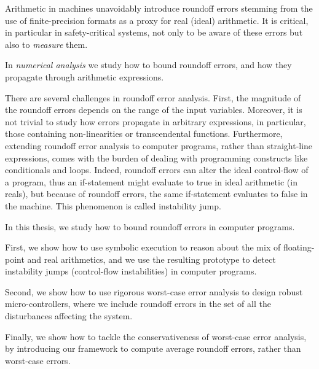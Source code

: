 %
Arithmetic in machines unavoidably introduce roundoff errors stemming from the use of finite-precision formats as a proxy for real (ideal) arithmetic. 
%
It is critical, in particular in safety-critical systems, not only to be aware of these errors but also to \emph{measure} them.
%

In \emph{numerical analysis} we study how to bound roundoff errors, and how they propagate through arithmetic expressions.
%

There are several challenges in roundoff error analysis. 
%
First, the magnitude of the roundoff errors depends on the range of the input variables. 
%
Moreover, it is not trivial to study how errors propagate in arbitrary expressions, in particular, those containing non-linearities or transcendental functions.
%
Furthermore, extending roundoff error analysis to computer programs, rather than straight-line expressions, comes with the burden of dealing with programming constructs like conditionals and loops. 
%
Indeed, roundoff errors can alter the ideal control-flow of a program, thus an if-statement might evaluate to true in ideal arithmetic (in reals), but because of roundoff errors, the same if-statement evaluates to false in the machine. 
%
This phenomenon is called instability jump.
%
%
%
%
%

In this thesis, we study how to bound roundoff errors in computer programs.

First, we show how to use symbolic execution to reason about the mix of floating-point and real arithmetics, and we use the resulting prototype to detect instability jumps (control-flow instabilities) in computer programs.
%

Second, we show how to use rigorous worst-case error analysis to design robust micro-controllers, where we include roundoff errors in the set of all the disturbances affecting the system.
%

Finally, we show how to tackle the conservativeness of worst-case error analysis, by introducing our framework to compute average roundoff errors, rather than worst-case errors.